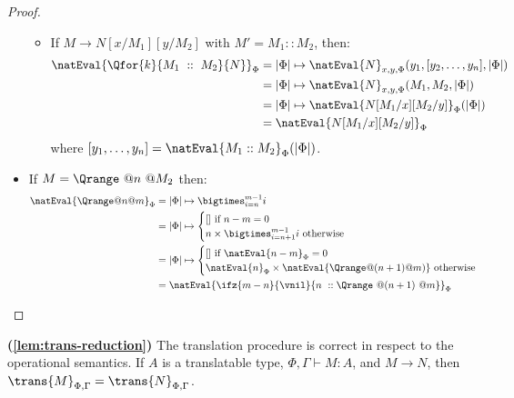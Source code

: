 \begin{proof}
\begin{itemize}
\begin{itemize}
            \item If $M\to N[x/M_1][y/M_2]$ with $M' = M_1::M_2$, then: 
            \begin{align*}
                \natEval{\Qfor{k}{M_1\ ::\ M_2}{N}}_\Phi &= |\Phi|\mapsto \natEval{N}_{x,y,\Phi}(y_1,[y_2,\dots,y_n],|\Phi|)\\
                &= |\Phi|\mapsto \natEval{N}_{x,y,\Phi}(M_1, M_2,|\Phi|)\\
                &= |\Phi|\mapsto \natEval{N[M_1/x][M_2/y]}_\Phi(|\Phi|)\\
                &= \natEval{N[M_1/x][M_2/y]}_\Phi
            \end{align*}
            where $[y_1,\dots,y_n] = \natEval{M_1::M_2}_\Phi(|\Phi|)$.
        \end{itemize}

        \item If $M= \Qrange\ @n\ @M_2$ then:
        \begin{align*}
            \natEval{\Qrange @n @m}_\Phi &= |\Phi| \mapsto \bigtimes_{i=n}^{m-1} i\\
            &=|\Phi| \mapsto \begin{cases}
                [] \text{ if } n-m = 0 \\
                n\times \bigtimes_{i=n+1}^{m-1} i \text{ otherwise}
            \end{cases}\\
            &=|\Phi| \mapsto \begin{cases}
                [] \text{ if } \natEval{n-m}_\Phi = 0 \\
                \natEval{n}_\Phi\times \natEval{\Qrange @(n+1) @ m)} \text{ otherwise}
            \end{cases}\\
            &= \natEval{\ifz{m-n}{\vnil}{n\ :: \Qrange\ @(n+1)\ @m}}_\Phi
        \end{align*}
    \end{itemize}
\end{proof}

\begin{lemma}{\!\textbf{(\ref{lem:trans-reduction})}}
    The translation procedure is correct in respect to the operational semantics.
    If $A$ is a translatable type, $\Phi, \Gamma \vdash M : A$, and $M \to N$,
    then $\trans{M}_{\Phi,\Gamma} = \trans{N}_{\Phi,\Gamma}$.
\end{lemma}

